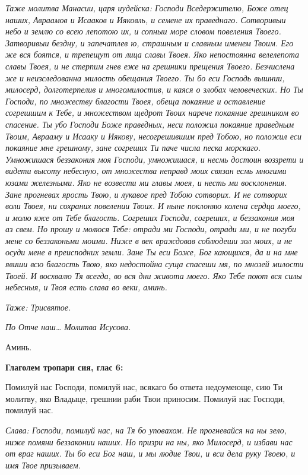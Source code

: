  \itshape Таже молитва Манасии, царя иудейска:\normalfont{} Господи Вседержителю, Боже
отец наших, Авраамов и Исааков и Ияковль, и семене их праведнаго.
Сотворивыи небо и землю со всею лепотою их, и сопныи море словом
повеления Твоего. Затворивыи бездну, и запечатлев ю, страшным и славным
именем Твоим. Его же вся боятся, и трепещут от лица славы Твоея.
Яко непостоянна велелепота славы Твоея, и не стерпим гнев еже на
грешники прещения Твоего. Безчислена же и неизследованна милость
обещания Твоего. Ты бо еси Господь вышнии, милосерд, долготерпелив и
многомилостив, и каяся о злобах человеческих. Но Ты Господи, по
множеству благости Твоея, обеща покаяние и оставление согрешшим к Тебе,
и множеством щедрот Твоих нарече покаяние грешником во спасение. Ты
убо Господи Боже праведных, неси положил покаяние праведным Твоим,
Аврааму и Исааку и Иякову, несогрешившим пред Тобою, но положил еси
покаяние мне грешному, зане согреших Ти паче числа песка морскаго.
Умножишася беззакония моя Господи, умножишася, и несмь достоин
воззрети и видети высоту небесную, от множества неправд моих связан есмь
многими юзами железными. Яко не возвести ми главы моея, и несть ми
восклонения. Зане прогневах ярость Твою, и лукавое пред Тобою сотворих.
И не сотворих воли Твоея, ни сохраних повелении Твоих. И ныне
поклоняю колена сердца моего, и молю яже от Тебе благость. Согреших
Господи, согреших, и беззакония моя аз свем. Но прошу и молюся
Тебе: отради ми Господи, отради ми, и не погуби мене со беззаконьми
моими. Ниже в век враждовав соблюдеши зол моих, и не осуди мене
в преисподних земли. Зане Ты еси Боже, Бог кающихся, да и на
мне явиши всю благость Твою, яко недостойна суща спасеши мя, по
мнозей милости Твоей. И восхвалю Тя всегда, во вся дни живота
моего. Яко Тебе поют вся силы небесныя, и Твоя есть слава во веки,
аминь.


 \itshape Таже:\normalfont{} \itshape Трисвятое\normalfont{}.



 \itshape По\normalfont{} Отче наш… \itshape Молитва Исусова\normalfont{}.


   Аминь.






 

\bfseries Глаголем тропари сия, глас 6:\normalfont{}


   Помилуй нас Господи, помилуй нас, всякаго бо ответа недоумеюще, сию
Ти молитву, яко Владыце, грешнии раби Твои приносим. Помилуй нас
Господи, помилуй нас.


 \itshape Слава:\normalfont{} Господи, помилуй нас, на Тя бо уповахом. Не прогневайся на ны
зело, ниже помяни беззаконии наших. Но призри на ны, яко Милосерд, и
избави нас от враг наших. Ты бо еси Бог наш, и мы людие Твои, и вси дела
руку Твоею, и имя Твое призываем.



